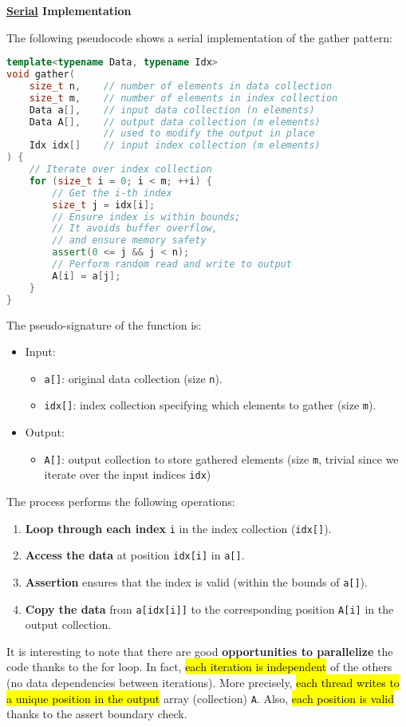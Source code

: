 \highspace
\begin{flushleft}
    \textcolor{Green3}{ \textbf{\underline{Serial} Implementation}}
\end{flushleft}
The following pseudocode shows a serial implementation of the gather pattern:
\begin{lstlisting}[language=c++]
template<typename Data, typename Idx>
void gather(
    size_t n,    // number of elements in data collection
    size_t m,    // number of elements in index collection
    Data a[],    // input data collection (n elements)
    Data A[],    // output data collection (m elements)
                 // used to modify the output in place
    Idx idx[]    // input index collection (m elements)
) {
    // Iterate over index collection
    for (size_t i = 0; i < m; ++i) {
        // Get the i-th index
        size_t j = idx[i];
        // Ensure index is within bounds;
        // It avoids buffer overflow,
        // and ensure memory safety
        assert(0 <= j && j < n);
        // Perform random read and write to output
        A[i] = a[j];
    }
}
\end{lstlisting}
The pseudo-signature of the function is:
\begin{itemize}
    \item Input:
    \begin{itemize}
        \item \texttt{a[]}: original data collection (size \texttt{n}).
        \item \texttt{idx[]}: index collection specifying which elements to gather (size \texttt{m}).
    \end{itemize}

    \item Output:
    \begin{itemize}
        \item \texttt{A[]}: output collection to store gathered elements (size \texttt{m}, trivial since we iterate over the input indices \texttt{idx})
    \end{itemize}
\end{itemize}
The process performs the following operations:
\begin{enumerate}
    \item \textbf{Loop through each index} \texttt{i} in the index collection (\texttt{idx[]}).
    \item \textbf{Access the data} at position \texttt{idx[i]} in \texttt{a[]}.
    \item \textbf{Assertion} ensures that the index is valid (within the bounds of \texttt{a[]}).
    \item \textbf{Copy the data} from \texttt{a[idx[i]]} to the corresponding position \texttt{A[i]} in the output collection.
\end{enumerate}
It is interesting to note that there are good \textbf{opportunities to parallelize} the code thanks to the for loop. In fact, \hl{each iteration is independent} of the others (no data dependencies between iterations). More precisely, \hl{each thread writes to a unique position in the output} array (collection) \texttt{A}. Also, \hl{each position is valid} thanks to the assert boundary check.

